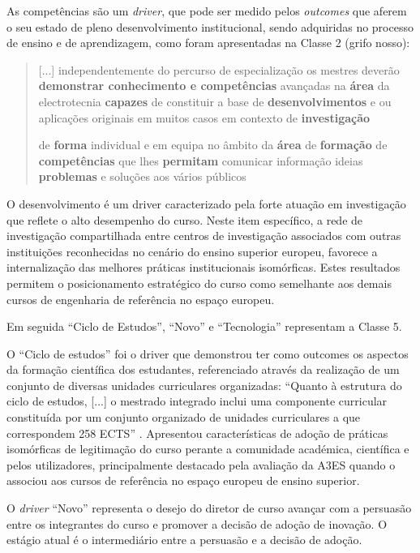 \documentclass{textolivre-html}
\begin{document}
As competências são um \textit{driver}, que pode ser medido pelos \textit{outcomes} que aferem o seu estado de pleno desenvolvimento institucional, sendo adquiridas no processo de ensino e de aprendizagem, como foram apresentadas na Classe 2 (grifo nosso):

\begin{quote}
[...] independentemente do percurso de especialização os mestres deverão \textbf{demonstrar conhecimento e competências} avançadas na \textbf{área} da electrotecnia \textbf{capazes} de constituir a base de \textbf{desenvolvimentos} e ou aplicações originais em muitos casos em contexto de \textbf{investigação}

de \textbf{forma} individual e em equipa no âmbito da \textbf{área} de \textbf{formação} de \textbf{competências} que lhes \textbf{permitam} comunicar informação ideias \textbf{problemas} e soluções aos vários públicos
\end{quote}

O desenvolvimento é um driver caracterizado pela forte atuação em investigação que reflete o alto desempenho do curso. Neste item específico, a rede de investigação compartilhada entre centros de investigação associados com outras instituições reconhecidas no cenário do ensino superior europeu, favorece a internalização das melhores práticas institucionais isomórficas. Estes resultados permitem o posicionamento estratégico do curso como semelhante aos demais cursos de engenharia de referência no espaço europeu.

Em seguida “Ciclo de Estudos”, “Novo” e “Tecnologia” representam a Classe 5.

O “Ciclo de estudos” foi o driver que demonstrou ter como outcomes os aspectos da formação científica dos estudantes, referenciado através da realização de um conjunto de diversas unidades curriculares organizadas: “Quanto à estrutura do ciclo de estudos, [...] o mestrado integrado inclui uma componente curricular constituída por um conjunto organizado de unidades curriculares a que correspondem 258 ECTS” \cite[parág. 5]{utad2015}. Apresentou características de adoção de práticas isomórficas de legitimação do curso perante a comunidade académica, científica e pelos utilizadores, principalmente destacado pela avaliação da A3ES quando o associou aos cursos de referência no espaço europeu de ensino superior.

O \textit{driver} “Novo” representa o desejo do diretor de curso avançar com a persuasão entre os integrantes do curso e promover a decisão de adoção de inovação. O estágio atual é o intermediário entre a persuasão e a decisão de adoção.
\end{document}
